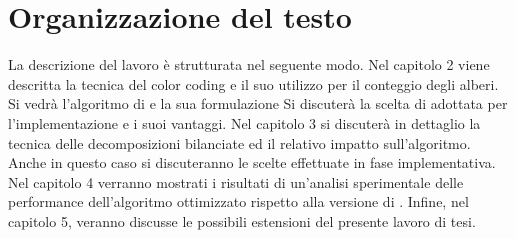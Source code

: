 \section{Organizzazione del testo}

La descrizione del lavoro \`e strutturata nel seguente modo.
Nel capitolo 2 viene descritta la tecnica del color coding e il suo utilizzo per il conteggio degli alberi.
Si vedr\`a l'algoritmo di \cite{bressan2018motif} e la sua formulazione Si discuter\`a la scelta di adottata per l'implementazione e i suoi vantaggi.
Nel capitolo 3 si discuter\`a in dettaglio la tecnica delle decomposizioni bilanciate ed il relativo impatto sull'algoritmo. Anche in questo caso si discuteranno le scelte effettuate in fase implementativa.
Nel capitolo 4 verranno mostrati i risultati di un'analisi sperimentale delle performance dell'algoritmo ottimizzato rispetto alla versione di \cite{bressan2018motif}.
Infine, nel capitolo 5, veranno discusse le possibili estensioni del presente lavoro di tesi.
